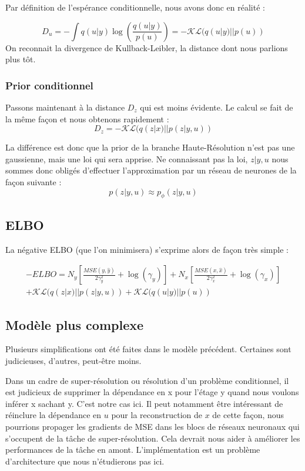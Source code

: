 \documentclass{article}
\begin{document}
Par définition de l'espérance conditionnelle, nous avons donc en réalité :

\begin{equation*}
    D_u = - \int q(u|y) \log\left(\frac{q(u|y)}{p(u)}\right) = - \mathcal{KL}(q(u|y)||p(u)) 
\end{equation*}
On reconnait la divergence de Kullback-Leibler, la distance dont nous parlions plus tôt.

\subsubsection{Prior conditionnel}
Passons maintenant à la distance $D_z$ qui est moins évidente.
Le calcul se fait de la même façon et nous obtenons rapidement :
\begin{equation}
    D_z = - \mathcal{KL}(q(z|x)||p(z|y,u))
\end{equation}

La différence est donc que la prior de la branche Haute-Résolution n'est pas une gaussienne, mais une loi qui sera apprise.
Ne connaissant pas la loi, $z|y,u$ nous sommes donc obligés d'effectuer l'approximation par un réseau de neurones de la façon suivante :
\begin{equation*}
    p(z|y,u) \approx p_\phi(z|y,u)
\end{equation*}

\subsection{ELBO}
La négative ELBO (que l'on minimisera) s'exprime alors de façon très simple :

\begin{multline}
    - ELBO = N_y\left[\frac{MSE(y,\hat{y})}{2\gamma_y^2} + \log(\gamma_y)\right] + N_x\left[\frac{MSE(x,\hat{x})}{2\gamma_x^2} + \log(\gamma_x)\right]\\ + \mathcal{KL}(q(z|x)||p(z|y,u)) + \mathcal{KL}(q(u|y)||p(u)) 
\end{multline}

\subsection{Modèle plus complexe}
Plusieurs simplifications ont été faites dans le modèle précédent. Certaines sont judicieuses, d'autres, peut-être moins. 

Dans un cadre de super-résolution ou résolution d'un problème conditionnel, il est judicieux de supprimer la dépendance en x pour l'étage y quand nous voulons inférer x sachant y. C'est notre cas ici. Il peut notamment être intéressant de réinclure la dépendance en $u$ pour la reconstruction de $x$ de cette façon, nous pourrions propager les gradients de MSE dans les blocs de réseaux neuronaux qui s'occupent de la tâche de super-résolution. Cela devrait nous aider à améliorer les performances de la tâche en amont. L'implémentation est un problème d'architecture que nous n'étudierons pas ici.
\end{document}
